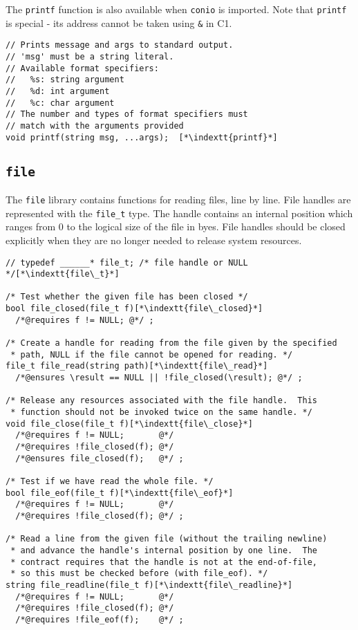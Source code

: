 \documentclass[11pt]{article}
\makeatletter
\newcommand{\indextt}[1]{\index{#1@\texttt{#1}}}
\makeatother
\begin{document}
The \lstinline'printf' function is also available when \lstinline'conio' is imported.
Note that \lstinline'printf' is special - its address cannot be taken using \lstinline'&' in C1.
\begin{lstlisting}
// Prints message and args to standard output.
// 'msg' must be a string literal.
// Available format specifiers:
//   %s: string argument 
//   %d: int argument 
//   %c: char argument
// The number and types of format specifiers must 
// match with the arguments provided
void printf(string msg, ...args);  [*\indextt{printf}*]
\end{lstlisting}

\newpage
\subsection{\tt file}

The \lstinline'file' library contains functions for reading files, line by
line.  File handles are represented with the \lstinline'file_t' type.  The
handle contains an internal position which ranges from 0 to the
logical size of the file in byes.  File handles should be closed
explicitly when they are no longer needed to release system resources.

\begin{lstlisting}
// typedef ______* file_t; /* file handle or NULL */[*\indextt{file\_t}*]

/* Test whether the given file has been closed */
bool file_closed(file_t f)[*\indextt{file\_closed}*]
  /*@requires f != NULL; @*/ ;

/* Create a handle for reading from the file given by the specified
 * path, NULL if the file cannot be opened for reading. */
file_t file_read(string path)[*\indextt{file\_read}*]
  /*@ensures \result == NULL || !file_closed(\result); @*/ ;

/* Release any resources associated with the file handle.  This
 * function should not be invoked twice on the same handle. */
void file_close(file_t f)[*\indextt{file\_close}*]
  /*@requires f != NULL;       @*/
  /*@requires !file_closed(f); @*/
  /*@ensures file_closed(f);   @*/ ;

/* Test if we have read the whole file. */
bool file_eof(file_t f)[*\indextt{file\_eof}*]
  /*@requires f != NULL;       @*/
  /*@requires !file_closed(f); @*/ ;

/* Read a line from the given file (without the trailing newline)
 * and advance the handle's internal position by one line.  The
 * contract requires that the handle is not at the end-of-file,
 * so this must be checked before (with file_eof). */
string file_readline(file_t f)[*\indextt{file\_readline}*]
  /*@requires f != NULL;       @*/
  /*@requires !file_closed(f); @*/
  /*@requires !file_eof(f);    @*/ ;
\end{lstlisting}
\end{document}
